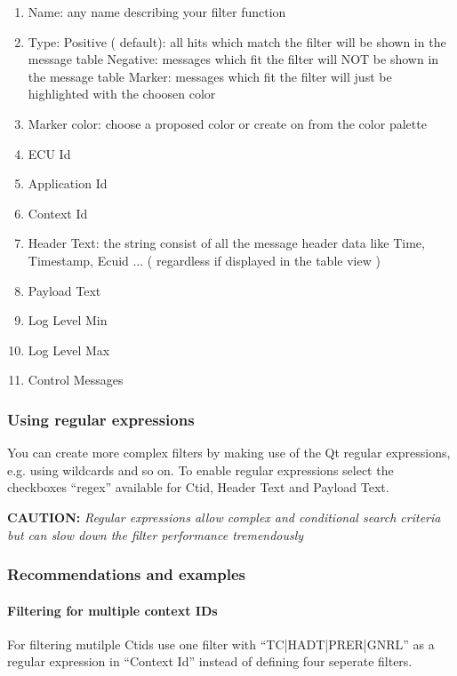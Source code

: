 \documentclass[a4paper,11pt]{article}
\newcommand{\caution}[1]{\begin{ibox} \textbf{CAUTION:} \emph{#1} \end{ibox}}
\begin{document}
\begin{enumerate}
\item Name: any name describing your filter function
\item Type: \linebreak
      Positive ( default): all hits which match the filter will be shown in the message table\linebreak
      Negative: messages which fit the filter will NOT be shown in the message table\linebreak
      Marker: messages which fit the filter will just be highlighted with the choosen color\linebreak
\item Marker color: choose a proposed color or create on from the color palette
\item ECU Id
\item Application Id
\item Context Id
\item Header Text: the string consist of all the message header data like Time, Timestamp, Ecuid ...
      ( regardless if displayed in the table view )
\item Payload Text
\item Log Level Min
\item Log Level Max
\item Control Messages
\end{enumerate}


\subsubsection{Using regular expressions}
You can create more complex filters by making use of the Qt regular expressions, e.g. using wildcards and so on.
To enable regular expressions select the checkboxes ``regex'' available for Ctid, Header Text and Payload Text.

\caution{Regular expressions allow complex and conditional search criteria but can slow down the filter performance tremendously}

\subsubsection{Recommendations and examples}

\paragraph{Filtering for multiple context IDs}
For filtering mutilple Ctids use one filter with ``TC|HADT|PRER|GNRL'' as a regular expression in ``Context Id'' instead of defining four seperate filters.
\end{document}
